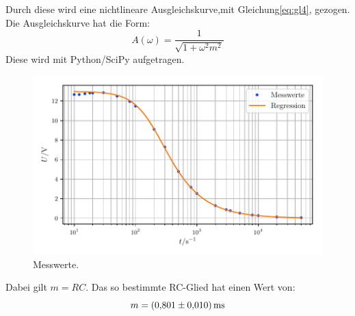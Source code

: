 Durch diese wird eine nichtlineare Ausgleichskurve,mit Gleichung\eqref{eq:gl4}, gezogen.
Die Ausgleichskurve hat die Form:
\begin{equation}

  A(\omega)= \frac{1}{\sqrt{1+\omega^2 m^2}}
\end{equation}
Diese wird mit Python/SciPy aufgetragen.
\begin{figure}[H]
    \centering
    \includegraphics[width=\textwidth]{build/messung2.pdf}
    \caption{Messwerte.}
    \label{fig:plot2}
\end{figure}
\noindent Dabei gilt $m=RC$.
Das so bestimmte RC-Glied hat einen Wert von:
\begin{equation*}
  m = \SI{0.801\pm0.01}{\milli\second}
\end{equation*}
%

